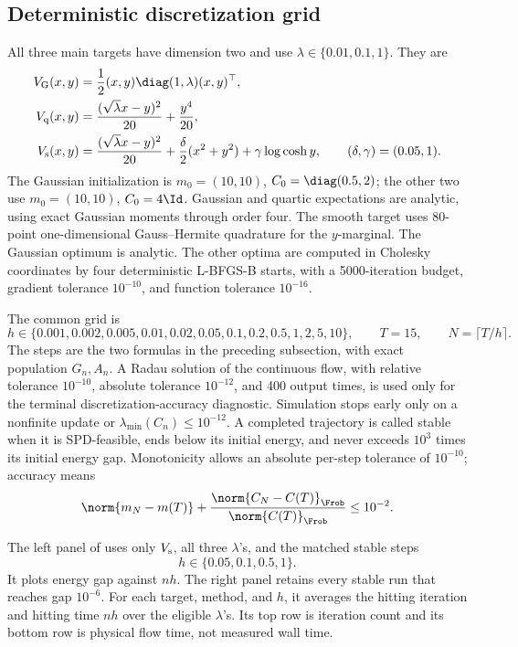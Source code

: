 \subsection{Deterministic discretization grid}

All three main targets have dimension two and use
\(\lambda\in\{0.01,0.1,1\}\).  They are
\begin{align*}
  V_{\rm G}(x,y)
  &=\frac12(x,y)\diag(1,\lambda)(x,y)^\top,\\
  V_{\rm q}(x,y)
  &=\frac{(\sqrt\lambda x-y)^2}{20}+\frac{y^4}{20},\\
  V_{\rm s}(x,y)
  &=\frac{(\sqrt\lambda x-y)^2}{20}
    +\frac{\delta}{2}(x^2+y^2)+\gamma\log\cosh y,
  \qquad (\delta,\gamma)=(0.05,1).
\end{align*}
The Gaussian initialization is
\(m_0=(10,10)\), \(C_0=\diag(0.5,2)\); the other two use
\(m_0=(10,10)\), \(C_0=4\Id\).  Gaussian and quartic expectations are analytic,
using exact Gaussian moments through order four.  The smooth target uses
80-point one-dimensional Gauss--Hermite quadrature for the \(y\)-marginal.
The Gaussian optimum is analytic.  The other optima are computed in Cholesky
coordinates by four deterministic L-BFGS-B starts, with a 5000-iteration
budget, gradient tolerance \(10^{-10}\), and function tolerance \(10^{-16}\).

The common grid is
\[
  h\in\{0.001,0.002,0.005,0.01,0.02,0.05,0.1,0.2,
           0.5,1,2,5,10\},
  \qquad T=15,\qquad N=\lceil T/h\rceil.
\]
The steps are the two formulas in the preceding subsection, with exact
population \(G_n,A_n\).  A Radau solution of the continuous flow, with relative
tolerance \(10^{-10}\), absolute tolerance \(10^{-12}\), and 400 output
times, is used only for the terminal discretization-accuracy diagnostic.
Simulation stops early only on a nonfinite update or
\(\lambda_{\min}(C_n)\leq10^{-12}\).  A completed trajectory is called stable
when it is SPD-feasible, ends below its initial energy, and never exceeds
\(10^3\) times its initial energy gap.  Monotonicity allows an absolute
per-step tolerance of \(10^{-10}\); accuracy means
\[
  \norm{m_N-m(T)}+
  \frac{\norm{C_N-C(T)}_{\Frob}}{\norm{C(T)}_{\Frob}}
  \leq10^{-2}.
\]

The left panel of  uses only \(V_{\rm s}\), all
three \(\lambda\)'s, and the matched stable steps
\[
  h\in\{0.05,0.1,0.5,1\}.
\]
It plots energy gap against \(nh\).  The right
panel retains every stable run that reaches gap \(10^{-6}\).  For each target,
method, and \(h\), it averages the hitting iteration and hitting time \(nh\)
over the eligible \(\lambda\)'s.  Its top row is iteration count and its bottom
row is physical flow time, not measured wall time.

